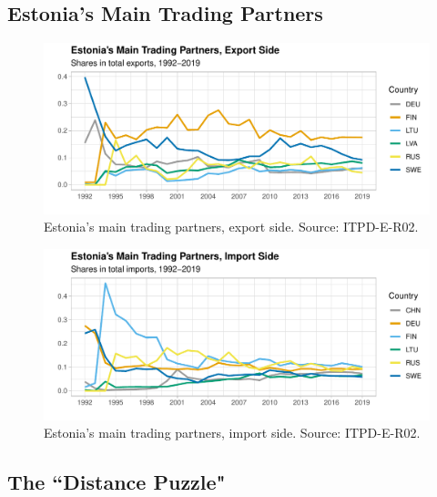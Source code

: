 \documentclass[a4paper,10pt]{article}
\begin{document}
\subsection{Estonia's Main Trading Partners} \label{appendix_mtp}

\begin{figure}[!ht]
	\centering
	\includegraphics[width=0.75\linewidth]{EST_exports_partners}
	\caption{Estonia's main trading partners, export side. Source: ITPD-E-R02.}
	\label{fig:2}
\end{figure}

\begin{figure}[!ht]
	\centering
	\includegraphics[width=0.75\linewidth]{EST_imports_partners}
	\caption{Estonia's main trading partners, import side. Source: ITPD-E-R02.}
	\label{fig:3}
\end{figure}

\newpage

\subsection{The ``Distance Puzzle"} \label{appendix_distance}
\end{document}
